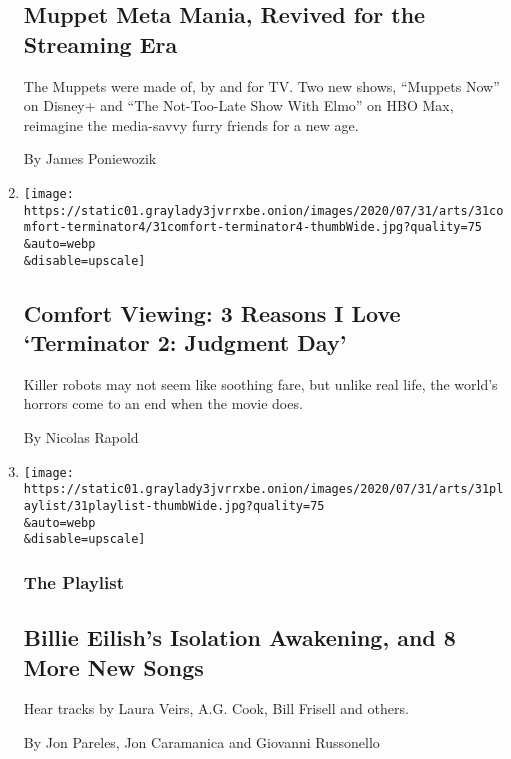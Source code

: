 \begin{enumerate}
  \hypertarget{muppet-meta-mania-revived-for-the-streaming-era}{%
  \subsection{Muppet Meta Mania, Revived for the Streaming
  Era}\label{muppet-meta-mania-revived-for-the-streaming-era}}

  The Muppets were made of, by and for TV. Two new shows, ``Muppets
  Now'' on Disney+ and ``The Not-Too-Late Show With Elmo'' on HBO Max,
  reimagine the media-savvy furry friends for a new age.

  By James Poniewozik
\item
  \href{/2020/07/31/movies/comfort-viewing-terminator-2.html}{}

  \texttt{[image: https://static01.graylady3jvrrxbe.onion/images/2020/07/31/arts/31comfort-terminator4/31comfort-terminator4-thumbWide.jpg?quality=75\\\&auto=webp\\\&disable=upscale]}

  \hypertarget{comfort-viewing-3-reasons-i-love-terminator-2-judgment-day}{%
  \subsection{Comfort Viewing: 3 Reasons I Love `Terminator 2: Judgment
  Day'}\label{comfort-viewing-3-reasons-i-love-terminator-2-judgment-day}}

  Killer robots may not seem like soothing fare, but unlike real life,
  the world's horrors come to an end when the movie does.

  By Nicolas Rapold
\item
  \href{/2020/07/31/arts/music/playlist-billie-eilish-snakehips-a-boogie.html}{}

  \texttt{[image: https://static01.graylady3jvrrxbe.onion/images/2020/07/31/arts/31playlist/31playlist-thumbWide.jpg?quality=75\\\&auto=webp\\\&disable=upscale]}

  \hypertarget{the-playlist}{%
  \subsubsection{The Playlist}\label{the-playlist}}

  \hypertarget{billie-eilishs-isolation-awakening-and-8-more-new-songs}{%
  \subsection{Billie Eilish's Isolation Awakening, and 8 More New
  Songs}\label{billie-eilishs-isolation-awakening-and-8-more-new-songs}}

  Hear tracks by Laura Veirs, A.G. Cook, Bill Frisell and others.

  By Jon Pareles, Jon Caramanica and Giovanni Russonello
\end{enumerate}

